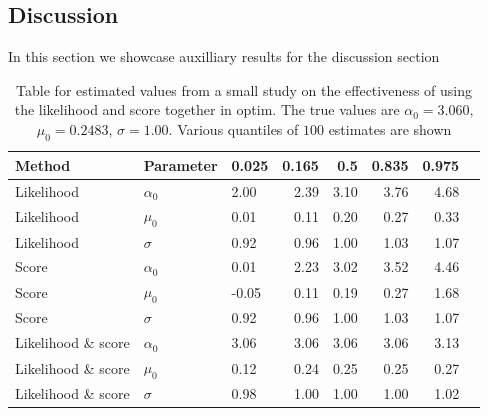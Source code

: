 \subsection{Discussion}
In this section we showcase auxilliary results for the discussion section
\begin{table}[h!]
    \centering
    \begin{tabular}{lllrrrrr}
      \hline 
     Method              & Parameter & 0.025 & 0.165 & 0.5 & 0.835 & 0.975 \\ \hline
     Likelihood          & $\alpha_0$ & 2.00 & 2.39 & 3.10 & 3.76 & 4.68 \\ 
     Likelihood          & $\mu_0$ & 0.01 & 0.11 & 0.20 & 0.27 & 0.33 \\ 
     Likelihood          & $\sigma$ & 0.92 & 0.96 & 1.00 & 1.03 & 1.07 \\ 
     Score               & $\alpha_0$ & 0.01 & 2.23 & 3.02 & 3.52 & 4.46 \\ 
     Score               & $\mu_0$ & -0.05 & 0.11 & 0.19 & 0.27 & 1.68 \\ 
     Score               & $\sigma$ & 0.92 & 0.96 & 1.00 & 1.03 & 1.07 \\ 
     Likelihood \& score & $\alpha_0$ & 3.06 & 3.06 & 3.06 & 3.06 & 3.13 \\ 
     Likelihood \& score & $\mu_0$ & 0.12 & 0.24 & 0.25 & 0.25 & 0.27 \\ 
     Likelihood \& score & $\sigma$ & 0.98 & 1.00 & 1.00 & 1.00 & 1.02 \\ 
       \hline
    \end{tabular}
    \caption{Table for estimated values from a small study on the effectiveness of using the likelihood and score together in optim. The true values are $\alpha_0 = 3.060$, $\mu_0 = 0.2483$, $\sigma = 1.00$. Various quantiles of $100$ estimates are shown}
    \label{table:smallOUExperiment}
    \end{table}